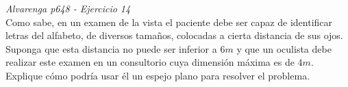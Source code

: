 \textit{Alvarenga p648 - Ejercicio 14}\\Como sabe, en un examen de la vista el paciente debe ser capaz de identificar letras del alfabeto, de diversos tamaños, colocadas a cierta distancia de sus ojos. Suponga que esta distancia no puede ser inferior a $6m$ y que un oculista debe realizar este examen en un consultorio cuya dimensión máxima es de $4 m$. Explique cómo podría usar él un espejo plano para resolver el problema.